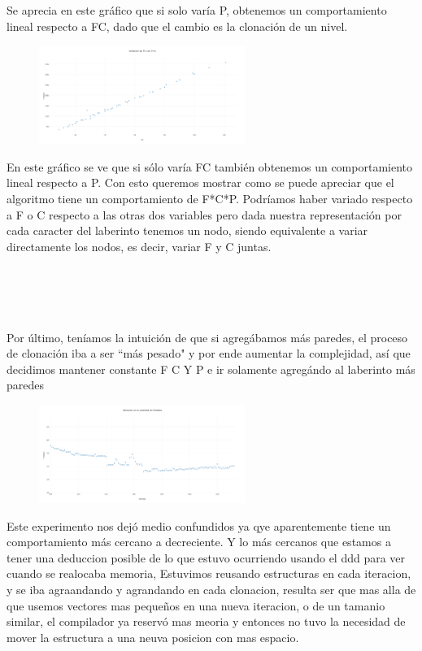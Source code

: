 \documentclass[spanish,12pt]{article}
\begin{document}
Se aprecia en este gráfico que si solo varía P, obtenemos un comportamiento lineal respecto a FC, dado que el cambio es la clonación de un nivel.


\begin{figure}[H]
\centering
\includegraphics     [width=0.6\textwidth]{pfijo}
\caption{}
\end{figure}
En este gráfico se ve que si sólo varía FC también obtenemos un comportamiento lineal respecto a P.
Con esto queremos mostrar como se puede apreciar que el algoritmo tiene un comportamiento de F*C*P. Podríamos haber variado respecto a F o C respecto a las otras dos variables pero dada nuestra representación
por cada caracter del laberinto tenemos un nodo, siendo equivalente a variar directamente los nodos, es decir, variar F y C juntas.


\\
\\
\\
\\



Por último, teníamos la intuición de que si agregábamos más paredes, el proceso de clonación iba a ser ``más pesado" y por ende aumentar la complejidad, así que decidimos mantener constante F C Y P e ir solamente agregándo al laberinto más paredes
\begin{figure}[H]
\centering
\includegraphics     [width=0.6\textwidth]{paredesfijas}
\caption{}
\end{figure}

Este experimento nos dejó medio confundidos ya qye aparentemente tiene un comportamiento más cercano a decreciente. Y lo más cercanos que estamos a tener una deduccion posible de lo que estuvo ocurriendo  usando el ddd para ver cuando se realocaba memoria,
Estuvimos reusando estructuras en cada iteracion, y se iba agraandando y agrandando en cada clonacion,  resulta ser que mas alla de que usemos vectores mas pequeños en una nueva iteracion, o de un tamanio similar, el compilador ya reservó mas meoria y entonces no tuvo la necesidad de mover la estructura a una neuva posicion con mas espacio.
\end{document}
